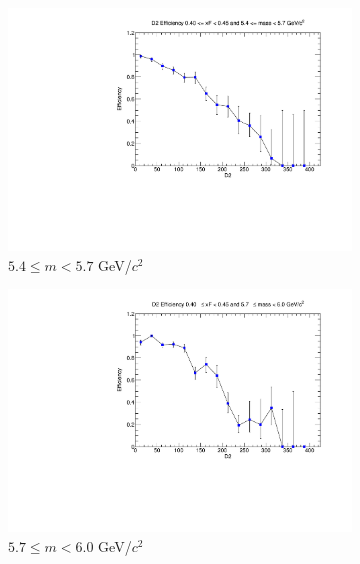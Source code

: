 \documentclass[11pt]{article}
\begin{document}
\begin{figure}[p]
\begin{subfigure}[b]{0.32\textwidth}
        \includegraphics[width=\textwidth]{./kTrackerEfficiencyPlots/D2_Efficiency_xF8_mass4.pdf}
        \caption{$5.4 \leq m < 5.7$ GeV/$c^2$}
    \end{subfigure}\hfill
    \begin{subfigure}[b]{0.32\textwidth}
        \centering
        \includegraphics[width=\textwidth]{./kTrackerEfficiencyPlots/D2_Efficiency_xF8_mass5.pdf}
        \caption{$5.7 \leq m < 6.0$ GeV/$c^2$}
    \end{subfigure}\vspace{0.5cm}
    \begin{subfigure}[b]{0.32\textwidth}
        \centering

\end{subfigure}
\end{figure}
\end{document}
